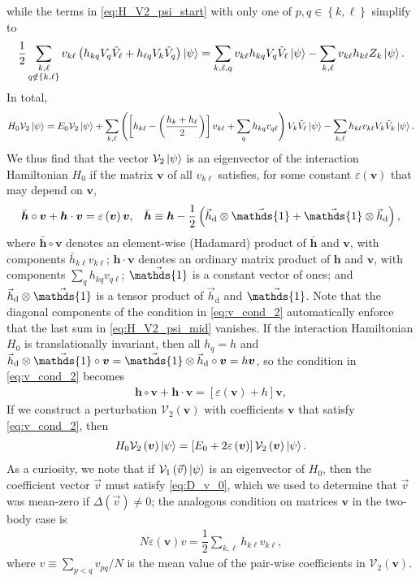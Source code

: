 \documentclass[nofootinbib,notitlepage,11pt]{revtex4-2}
\newcommand{\f}[2]{\dfrac{#1}{#2}} %
\newcommand{\p}[1]{\left(#1\right)} %
\renewcommand{\sp}[1]{\left[#1\right]} %
\renewcommand{\set}[1]{\left\{#1\right\}} %
\renewcommand{\c}{\cdot} %
\renewcommand{\oc}{\circ} %
\newcommand{\m}{\bm} %
\renewcommand{\v}{\vec} %
\newcommand{\1}{\mathds{1}}
\renewcommand{\d}{\text{d}}
\newcommand{\e}{\varepsilon}
\newcommand{\V}{\mathcal{V}}
\begin{document}
while the terms in \eqref{eq:H_V2_psi_start} with only one of
$p,q\in\set{k,\ell}$ simplify to
\begin{align}
  \f12 \sum_{\substack{k,\ell\\q\notin\set{k,\ell}}} v_{k\ell}
  \p{h_{kq} V_q \tilde V_\ell + h_{\ell q} V_k \tilde V_q} \ket\psi
  = \sum_{k,\ell,q} v_{k\ell} h_{kq} V_q \tilde V_\ell \ket\psi
  - \sum_{k,\ell} v_{k\ell} h_{k\ell} Z_k \ket\psi.
\end{align}
In total,
\begin{align}
  H_0 \V_2 \ket\psi
  = E_0 \V_2 \ket\psi
  + \sum_{k,\ell} \p{\sp{h_{k\ell}-\p{\f{h_k+h_\ell}{2}}} v_{k\ell}
    + \sum_q h_{kq} v_{q\ell}} V_k \tilde V_\ell \ket\psi
  - \sum_{k,\ell} h_{k\ell} v_{k\ell} V_k \tilde V_k \ket\psi.
  \label{eq:H_V2_psi_mid}
\end{align}
We thus find that the vector $\V_2\ket\psi$ is an eigenvector of the
interaction Hamiltonian $H_0$ if the matrix $\m v$ of all $v_{k\ell}$
satisfies, for some constant $\e\p{\m v}$ that may depend on $\m v$,
\begin{align}
  \bar{\m h}\oc\m v + \m h\c\m v = \e\p{\m v} \m v,
  &&
  \bar{\m h}
  \equiv \m h - \f12\p{\v h_\d\otimes\v\1 + \v\1\otimes\v h_\d},
  \label{eq:v_cond_2}
\end{align}
where $\bar{\m h}\oc\m v$ denotes an element-wise (Hadamard) product
of $\bar{\m h}$ and $\m v$, with components
$\bar h_{k\ell} v_{k\ell}$; $\m h\c\m v$ denotes an ordinary matrix
product of $\m h$ and $\m v$, with components
$\sum_q h_{kq} v_{q\ell}$; $\v\1$ is a constant vector of ones; and
$\v h_\d\otimes\v\1$ is a tensor product of $\v h_\d$ and $\v\1$.
Note that the diagonal components of the condition in
\eqref{eq:v_cond_2} automatically enforce that the last sum in
\eqref{eq:H_V2_psi_mid} vanishes.  If the interaction Hamiltonian
$H_0$ is translationally invariant, then all $h_q=h$ and
$\v h_\d\otimes\v\1\oc\m v=\v\1\otimes\v h_\d\oc\m v=h\m v$, so the
condition in \eqref{eq:v_cond_2} becomes
\begin{align}
  \m h\oc\m v + \m h\c\m v = \sp{\e\p{\m v}+h} \m v,
\end{align}
If we construct a perturbation $\V_2\p{\m v}$ with coefficients $\m v$
that satisfy \eqref{eq:v_cond_2}, then
\begin{align}
  H_0 \V_2\p{\m v} \ket\psi
  = \sp{E_0 + 2\e\p{\m v}} \V_2\p{\m v} \ket\psi.
\end{align}
As a curiosity, we note that if $\V_1\p{\v v}\ket\psi$ is an
eigenvector of $H_0$, then the coefficient vector $\v v$ must satisfy
\eqref{eq:D_v_0}, which we used to determine that $\v v$ was mean-zero
if $\Delta\p{\v v}\ne0$; the analogous condition on matrices $\m v$ in
the two-body case is
\begin{align}
  N \e\p{\m v} v = \f12 \sum_{k,\ell} h_{k\ell} v_{k\ell},
\end{align}
where $v\equiv\sum_{p<q}v_{pq}/N$ is the mean value of the pair-wise
coefficients in $\V_2\p{\m v}$.
\end{document}
